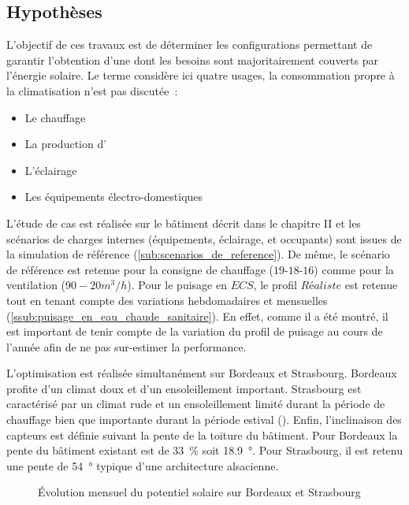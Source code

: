 \subsection{Hypothèses} %
\label{sub:hypotheses}
L’objectif de ces travaux est de déterminer les configurations permettant
de garantir l’obtention d’une  dont les besoins sont majoritairement couverts
par l’énergie solaire. Le terme  considère ici quatre usages, la consommation
propre à la climatisation n’est pas discutée~:
\begin{itemize}
  \item Le chauffage
  \item La production d’
  \item L’éclairage
  \item Les équipements électro-domestiques
\end{itemize}

L’étude de cas est réalisée sur le bâtiment décrit dans le chapitre II et les scénarios de
charges internes (équipements, éclairage, et occupants) sont issues de la simulation de
référence (\ref{sub:scenarios_de_reference}). De même, le scénario de référence est
retenue pour la consigne de chauffage ($19$-$18$-$16$) comme pour la ventilation
($90-20 \si{m^{3}\per h}$). Pour le puisage en $ECS$, le profil $Réaliste$ est retenue tout en tenant
compte des variations hebdomadaires et mensuelles
(\ref{ssub:puisage_en_eau_chaude_sanitaire}). En effet, comme il a été montré, il est
important de tenir compte de la variation du profil de puisage au cours de l’année afin de
ne pas sur-estimer la performance.

L’optimisation est réalisée simultanément sur Bordeaux et Strasbourg. Bordeaux profite
d’un climat doux et d’un ensoleillement important. Strasbourg est caractérisé par un
climat rude et un ensoleillement limité durant la période de chauffage bien que importante
durant la période estival (). Enfin,
l’inclinaison des capteurs est définie suivant la pente de la toiture du bâtiment. Pour
Bordeaux la pente du bâtiment existant est de \SI{33}{\percent} soit \SI{18.9}{\degree}.
Pour Strasbourg, il est retenu une pente de \SI{54}{\degree} typique d’une architecture
alsacienne.

\begin{figure}
    \centering
    \caption[Évolution mensuel du potentiel solaire sur Bordeaux et Strasbourg]
            {Évolution mensuel du potentiel solaire sur Bordeaux et Strasbourg}
    \label{fig:diff_ensoleillement_bor_stras}
\end{figure}


